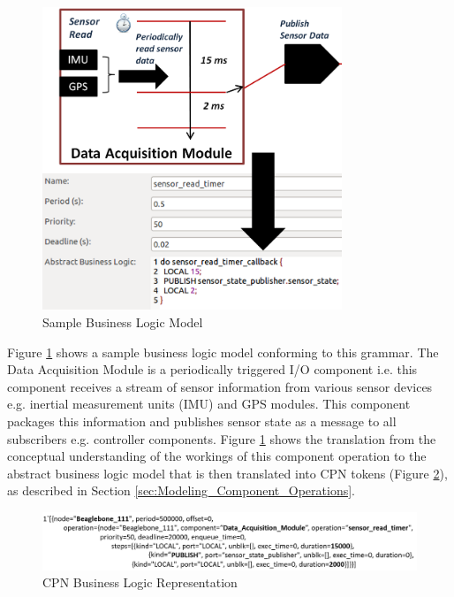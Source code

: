 \begin{figure}[ht]
	\centering
	\includegraphics[width=0.8\textwidth]{./img/abstract_business_logic}
	\caption{Sample Business Logic Model}
	\label{fig:sblm}
\end{figure}

Figure \ref{fig:sblm} shows a sample business logic model conforming to this grammar. The Data Acquisition Module is a periodically triggered I/O component i.e. this component receives a stream of sensor information from various sensor devices e.g. inertial measurement units (IMU) and GPS modules. This component packages this information and publishes sensor state as a message to all subscribers e.g. controller components. Figure \ref{fig:sblm} shows the translation from the conceptual understanding of the workings of this component operation to the abstract business logic model that is then translated into CPN tokens (Figure \ref{fig:blte}), as described in Section \ref{sec:Modeling_Component_Operations}. 

\begin{figure}[ht]
	\centering
	\includegraphics[width=\textwidth]{./img/cpn_business_logic_token_example}
	\caption{CPN Business Logic Representation}
	\label{fig:blte}
\end{figure}

